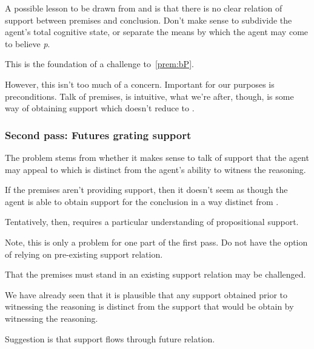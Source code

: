\begin{note}
  A possible lesson to be drawn from \citeauthor{Turri:2010aa} and \citeauthor{Goldman:1979ui} is that there is no clear relation of support between premises and conclusion.
  Don't make sense to subdivide the agent's total cognitive state, or separate the means by which the agent may come to believe \emph{p}.

  This is the foundation of a challenge to~\ref{prem:bP}.

  However, this isn't too much of a concern.
  Important for our purposes is preconditions.
  Talk of premises, is intuitive, what we're after, though, is some way of obtaining support which doesn't reduce to \AR{}.
\end{note}

\subsubsection{Second pass: Futures grating support}
\label{sec:second-pass:-futures}

\begin{note}
  The problem stems from whether it makes sense to talk of support that the agent may appeal to which is distinct from the agent's ability to witness the reasoning.

  If the premises aren't providing support, then it doesn't seem as though the agent is able to obtain support for the conclusion in a way distinct from \AR{}.

  Tentatively, then, \WR{} requires a particular understanding of propositional support.

  Note, this is only a problem for one part of the first pass.
  Do not have the option of relying on pre-existing support relation.

  That the premises must stand in an existing support relation may be challenged.

  We have already seen that it is plausible that any support obtained prior to witnessing the reasoning is distinct from the support that would be obtain by witnessing the reasoning.

  Suggestion is that support flows through future relation.
\end{note}

